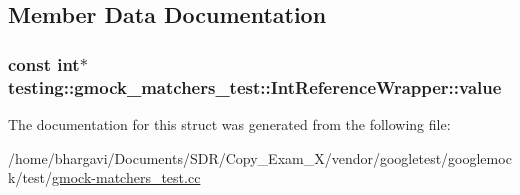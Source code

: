 \subsection{Member Data Documentation}
\subsubsection[{\texorpdfstring{value}{value}}]{\setlength{\rightskip}{0pt plus 5cm}const int$\ast$ testing\+::gmock\+\_\+matchers\+\_\+test\+::\+Int\+Reference\+Wrapper\+::value}\hypertarget{structtesting_1_1gmock__matchers__test_1_1_int_reference_wrapper_ac8fcb05733aa1fdb6c5236731b236cf6}{}\label{structtesting_1_1gmock__matchers__test_1_1_int_reference_wrapper_ac8fcb05733aa1fdb6c5236731b236cf6}


The documentation for this struct was generated from the following file\+:\begin{DoxyCompactItemize}
\item 
/home/bhargavi/\+Documents/\+S\+D\+R/\+Copy\+\_\+\+Exam\+\_\+X/vendor/googletest/googlemock/test/\hyperlink{gmock-matchers__test_8cc}{gmock-\/matchers\+\_\+test.\+cc}\end{DoxyCompactItemize}
